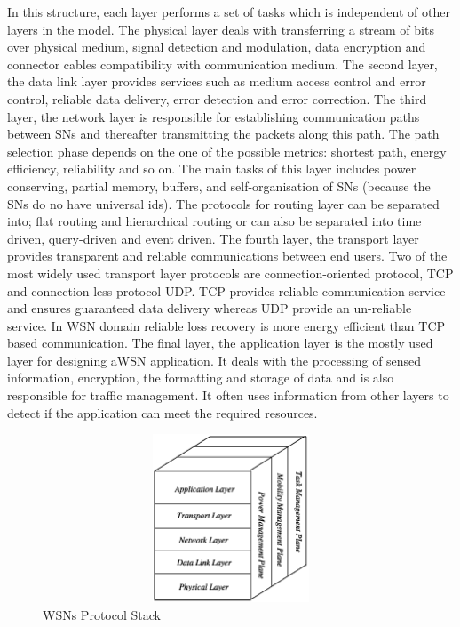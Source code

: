 In this structure, each layer performs a set of tasks which is independent of other layers in the model. The physical layer deals with transferring a stream of bits over physical medium, signal detection and modulation, data encryption and connector cables compatibility with communication medium. The second layer, the data link layer provides services such as medium access control and error control, reliable data delivery, error detection and error correction. The third layer, the network layer is responsible for establishing communication paths between \acp{SN} and thereafter transmitting the packets along this path. The path selection phase depends on the one of the possible metrics: shortest path, energy efficiency, reliability and so on. The main tasks of this layer includes power conserving, partial memory, buffers, and self-organisation of \acp{SN} (because the \acp{SN} do no have universal ids). The protocols for routing layer can be separated into; flat routing and hierarchical routing or can also be separated into time driven, query-driven and event driven. The fourth layer, the transport layer provides transparent and reliable communications between end users. Two of the most widely used transport layer protocols are connection-oriented protocol, \ac{TCP} and connection-less protocol \ac{UDP}. \ac{TCP} provides reliable communication service and ensures guaranteed data delivery whereas \ac{UDP} provide an un-reliable service. In \ac{WSN} domain reliable loss recovery is more energy efficient than \ac{TCP} based communication. The final layer, the application layer is the mostly used layer for designing a\ac{WSN} application. It deals with the processing of sensed information, encryption, the formatting and storage of data and is also responsible for traffic management. It often uses information from other layers to detect if the application can meet the required resources.

\begin{figure}
    \centering
    \includegraphics[width=1.0\textwidth,height=5cm,keepaspectratio]{Diagrams/Wireless-Sensor-Network-Architecture.png}
    \caption{\acp{WSN} Protocol Stack}
    \label{fig:Wireless-Sensor-Network-Architecture}
\end{figure}


